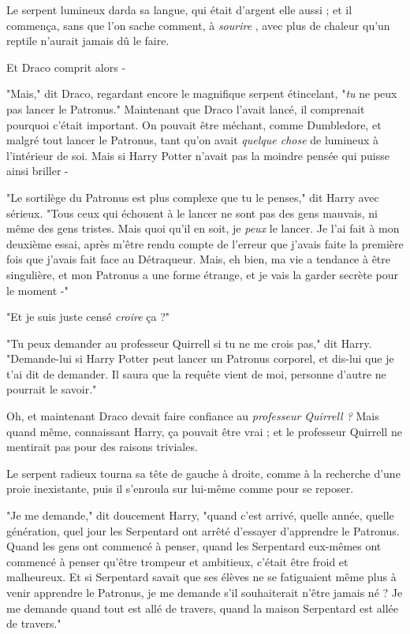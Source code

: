 Le serpent lumineux darda sa langue, qui était d'argent elle aussi ; et il commença, sans que l'on sache comment, à \emph{sourire} , avec plus de chaleur qu'un reptile n'aurait jamais dû le faire.

Et Draco comprit alors -

"Mais," dit Draco, regardant encore le magnifique serpent étincelant, "\emph{tu}  ne peux pas lancer le Patronus." Maintenant que Draco l'avait lancé, il comprenait pourquoi c'était important. On pouvait être méchant, comme Dumbledore, et malgré tout lancer le Patronus, tant qu'on avait \emph{quelque chose}  de lumineux à l'intérieur de soi. Mais si Harry Potter n'avait pas la moindre pensée qui puisse ainsi briller -

"Le sortilège du Patronus est plus complexe que tu le penses," dit Harry avec sérieux. "Tous ceux qui échouent à le lancer ne sont pas des gens mauvais, ni même des gens tristes. Mais quoi qu'il en soit, je \emph{peux}  le lancer. Je l'ai fait à mon deuxième essai, après m'être rendu compte de l'erreur que j'avais faite la première fois que j'avais fait face au Détraqueur. Mais, eh bien, ma vie a tendance à être singulière, et mon Patronus a une forme étrange, et je vais la garder secrète pour le moment -"

"Et je suis juste censé \emph{croire}  ça ?"

"Tu peux demander au professeur Quirrell si tu ne me crois pas," dit Harry. "Demande-lui si Harry Potter peut lancer un Patronus corporel, et dis-lui que je t'ai dit de demander. Il saura que la requête vient de moi, personne d'autre ne pourrait le savoir."

Oh, et maintenant Draco devait faire confiance au \emph{professeur Quirrell ?}  Mais quand même, connaissant Harry, ça pouvait être vrai ; et le professeur Quirrell ne mentirait pas pour des raisons triviales.

Le serpent radieux tourna sa tête de gauche à droite, comme à la recherche d'une proie inexistante, puis il s'enroula sur lui-même comme pour se reposer.

"Je me demande," dit doucement Harry, "quand c'est arrivé, quelle année, quelle génération, quel jour les Serpentard ont arrêté d'essayer d'apprendre le Patronus. Quand les gens ont commencé à penser, quand les Serpentard eux-mêmes ont commencé à penser qu'être trompeur et ambitieux, c'était être froid et malheureux. Et si Serpentard savait que ses élèves ne se fatiguaient même plus à venir apprendre le Patronus, je me demande s'il souhaiterait n'être jamais né ? Je me demande quand tout est allé de travers, quand la maison Serpentard est allée de travers."

